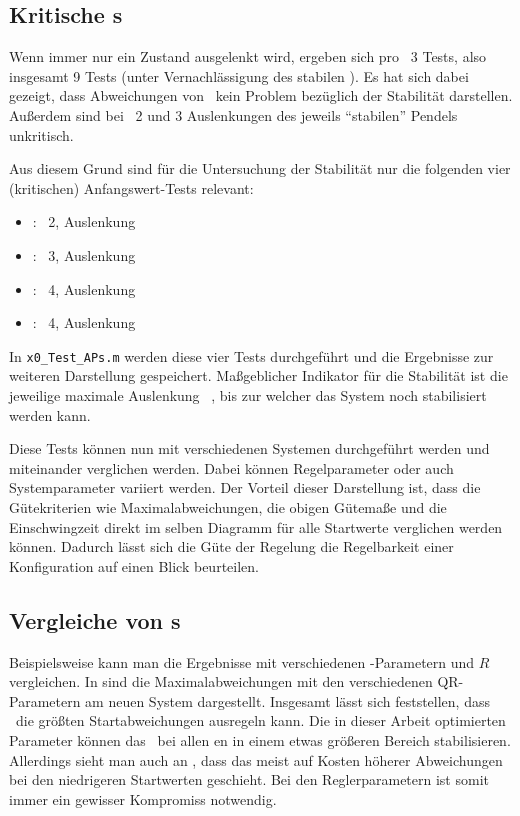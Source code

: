 \subsection{Kritische \xots s}\label{subsec:xotskrit}

Wenn immer nur ein Zustand ausgelenkt wird, ergeben sich pro \ap\ 3 Tests, also insgesamt 9 Tests (unter Vernachlässigung des stabilen \ape).
Es hat sich dabei gezeigt, dass Abweichungen von \xo\ kein Problem bezüglich der Stabilität darstellen.
Außerdem sind bei \ap\ 2 und 3 Auslenkungen des jeweils "`stabilen"' Pendels unkritisch.

Aus diesem Grund sind für die Untersuchung der Stabilität nur die folgenden vier (kritischen) Anfangswert-Tests relevant:
\begin{itemize}
	\item \texttt{\apz}: \ap\ 2, Auslenkung \phz
	\item \texttt{\apd}: \ap\ 3, Auslenkung \phe
	\item \texttt{}: \ap\ 4, Auslenkung \phe
	\item \texttt{}: \ap\ 4, Auslenkung \phz
\end{itemize}
In \texttt{x0\_Test\_APs.m} werden diese vier Tests durchgeführt und die Ergebnisse zur weiteren Darstellung gespeichert.
Maßgeblicher Indikator für die Stabilität ist die jeweilige maximale Auslenkung \phe\ \bzw \phz, bis zur welcher das System noch stabilisiert werden kann.

Diese Tests können nun mit verschiedenen Systemen durchgeführt werden und miteinander verglichen werden.
Dabei können Regelparameter oder auch Systemparameter variiert werden.
Der Vorteil dieser Darstellung ist, dass die Gütekriterien wie Maximalabweichungen, die obigen Gütemaße und die Einschwingzeit direkt im selben Diagramm für alle Startwerte verglichen werden können.
Dadurch lässt sich die Güte der Regelung \bzw die Regelbarkeit einer Konfiguration auf einen Blick beurteilen.


\subsection{Vergleiche von \xots s}\label{subsec:xotsvgl}

Beispielsweise kann man die Ergebnisse mit verschiedenen \ricc-Parametern  und $R$ vergleichen.
In  sind die Maximalabweichungen mit den verschiedenen QR-Parametern  am neuen System dargestellt.
Insgesamt lässt sich feststellen, dass \apd\ die größten Startabweichungen ausregeln kann.
Die in dieser Arbeit optimierten Parameter können das \dpd\ bei allen \ap en in einem etwas größeren Bereich stabilisieren.
Allerdings sieht man auch \zB an \apve, dass das meist auf Kosten höherer Abweichungen bei den niedrigeren Startwerten geschieht.
Bei den Reglerparametern ist somit immer ein gewisser Kompromiss notwendig.

